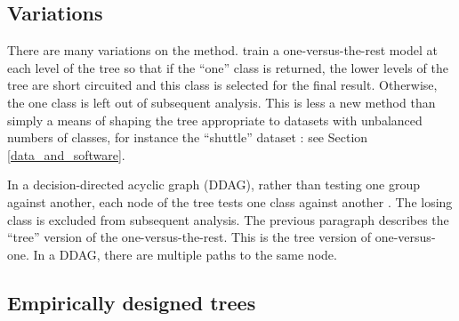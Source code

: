 \subsection{Variations}

There are many variations on the method. \citet{Ramanan_etal2007} train a 
one-versus-the-rest model at each level of the tree so that if the ``one''
class is returned, the lower levels of the tree are short circuited
and this class is selected for the final result. Otherwise, the one class
is left out of subsequent analysis. This is less a new method than simply
a means of shaping the tree appropriate to datasets with unbalanced
numbers of classes, for instance the ``shuttle'' dataset \citep{King_etal1995}:
see Section \ref{data_and_software}.

In a decision-directed acyclic graph (DDAG), 
rather than testing one group against another, 
each node of the tree tests one class against another \citep{Platt_etal2000}. 
The losing class is excluded from subsequent analysis. 
The previous paragraph describes the ``tree'' version of the one-versus-the-rest. 
This is the tree version of one-versus-one. 
In a DDAG, there are multiple paths to the same node.

\subsection{Empirically designed trees}

\label{empirical}

